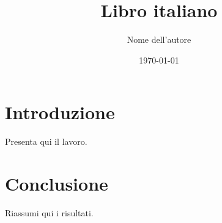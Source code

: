 \documentclass[11pt]{book}
\title{Libro italiano}
\author{Nome dell'autore}
\date{\today}
\begin{document}
\maketitle
\tableofcontents

\chapter{Introduzione}
Presenta qui il lavoro.

\chapter{Conclusione}
Riassumi qui i risultati.
\end{document}
